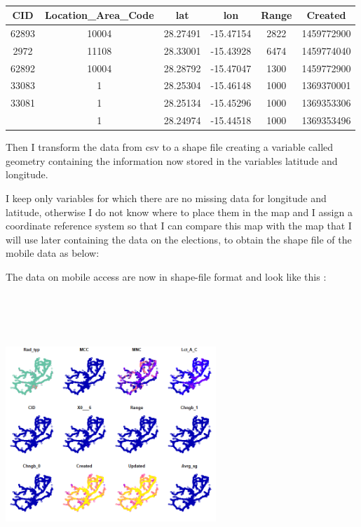 \documentclass[
]{article}
\begin{document}
\begin{longtable}[t]{cccccc}
\caption{\label{tab:upload}}\\
\toprule
CID & Location\_Area\_Code & lat & lon & Range & Created\\
\midrule
62893 & 10004 & 28.27491 & -15.47154 & 2822 & 1459772900\\
2972 & 11108 & 28.33001 & -15.43928 & 6474 & 1459774040\\
62892 & 10004 & 28.28792 & -15.47047 & 1300 & 1459772900\\
33083 & 1 & 28.25304 & -15.46148 & 1000 & 1369370001\\
33081 & 1 & 28.25134 & -15.45296 & 1000 & 1369353306\\
\addlinespace
33933 & 1 & 28.24974 & -15.44518 & 1000 & 1369353496\\
\bottomrule
\end{longtable}

Then I transform the data from csv to a shape file creating a variable
called geometry containing the information now stored in the variables
latitude and longitude.

I keep only variables for which there are no missing data for longitude
and latitude, otherwise I do not know where to place them in the map and
I assign a coordinate reference system so that I can compare this map
with the map that I will use later containing the data on the elections,
to obtain the shape file of the mobile data as below:

The data on mobile access are now in shape-file format and look like
this :

\includegraphics[width=3.125in,height=4.16667in]{mobile_access_new.png}
\end{document}
